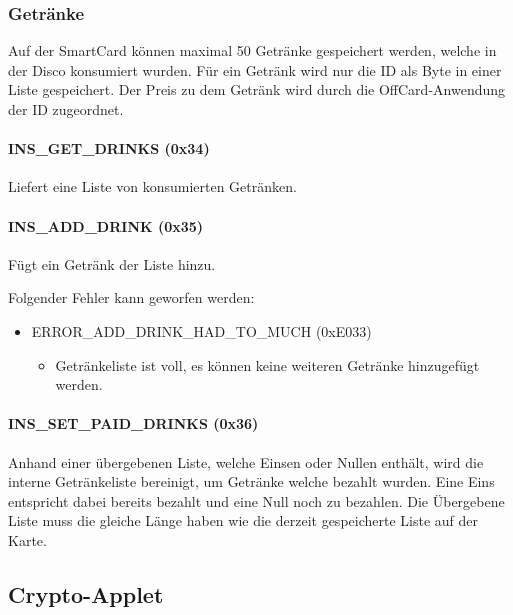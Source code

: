 \subsubsection{Getränke}
Auf der SmartCard können maximal 50 Getränke gespeichert werden, welche in der Disco konsumiert wurden.
Für ein Getränk wird nur die ID als Byte in einer Liste gespeichert.
Der Preis zu dem Getränk wird durch die OffCard-Anwendung der ID zugeordnet.
	
\paragraph{INS\_GET\_DRINKS (0x34)}
Liefert eine Liste von konsumierten Getränken.
\paragraph{INS\_ADD\_DRINK (0x35)}
Fügt ein Getränk der Liste hinzu.

Folgender Fehler kann geworfen werden:
\begin{itemize}
	\item ERROR\_ADD\_DRINK\_HAD\_TO\_MUCH (0xE033)
	\begin{itemize}
		\item Getränkeliste ist voll, es können keine weiteren Getränke hinzugefügt werden.
	\end{itemize}
\end{itemize}

\paragraph{INS\_SET\_PAID\_DRINKS (0x36)}
Anhand einer übergebenen Liste, welche Einsen oder Nullen enthält, wird die interne Getränkeliste bereinigt, um Getränke welche bezahlt wurden.
Eine Eins entspricht dabei bereits bezahlt und eine Null noch zu bezahlen.
Die Übergebene Liste muss die gleiche Länge haben wie die derzeit gespeicherte Liste auf der Karte.

\subsection{Crypto-Applet}


